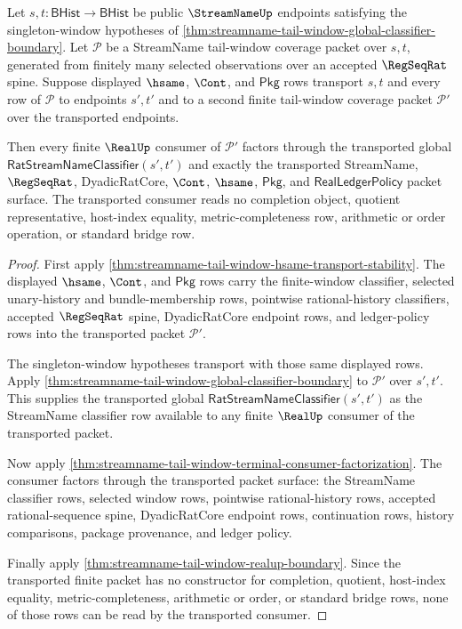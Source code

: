 \begin{theorem}
\label{thm:streamname-tail-window-global-classifier-transport-stability}
Let $s,t:\mathsf{BHist}\to\mathsf{BHist}$ be public $\StreamNameUp$
endpoints satisfying the singleton-window hypotheses of
\autoref{thm:streamname-tail-window-global-classifier-boundary}. Let
$\mathcal P$ be a StreamName tail-window coverage packet over $s,t$, generated
from finitely many selected observations over an accepted $\RegSeqRat$ spine.
Suppose displayed $\hsame$, $\Cont$, and $\mathsf{Pkg}$ rows transport
$s,t$ and every row of $\mathcal P$ to endpoints $s',t'$ and to a second
finite tail-window coverage packet $\mathcal P'$ over the transported
endpoints.

Then every finite $\RealUp$ consumer of $\mathcal P'$ factors through the
transported global
$\mathsf{RatStreamNameClassifier}(s',t')$ and exactly the transported
StreamName, $\RegSeqRat$, DyadicRatCore, $\Cont$, $\hsame$, $\mathsf{Pkg}$,
and $\mathsf{RealLedgerPolicy}$ packet surface. The transported consumer
reads no completion object, quotient representative, host-index equality,
metric-completeness row, arithmetic or order operation, or standard bridge
row.
\end{theorem}
\begin{proof}
First apply
\autoref{thm:streamname-tail-window-hsame-transport-stability}. The displayed
$\hsame$, $\Cont$, and $\mathsf{Pkg}$ rows carry the finite-window classifier,
selected unary-history and bundle-membership rows, pointwise
rational-history classifiers, accepted $\RegSeqRat$ spine, DyadicRatCore
endpoint rows, and ledger-policy rows into the transported packet
$\mathcal P'$.

The singleton-window hypotheses transport with those same displayed rows.
Apply \autoref{thm:streamname-tail-window-global-classifier-boundary} to
$\mathcal P'$ over $s',t'$. This supplies the transported global
$\mathsf{RatStreamNameClassifier}(s',t')$ as the StreamName classifier row
available to any finite $\RealUp$ consumer of the transported packet.

Now apply
\autoref{thm:streamname-tail-window-terminal-consumer-factorization}. The
consumer factors through the transported packet surface: the StreamName
classifier rows, selected window rows, pointwise rational-history rows,
accepted rational-sequence spine, DyadicRatCore endpoint rows, continuation
rows, history comparisons, package provenance, and ledger policy.

Finally apply \autoref{thm:streamname-tail-window-realup-boundary}. Since the
transported finite packet has no constructor for completion, quotient,
host-index equality, metric-completeness, arithmetic or order, or standard
bridge rows, none of those rows can be read by the transported consumer.
\end{proof}

